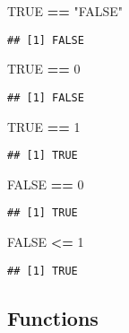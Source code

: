 \documentclass[
]{book}
\newenvironment{Shaded}{\begin{snugshade}}{\end{snugshade}}
\newcommand{\DecValTok}[1]{\textcolor[rgb]{0.00,0.00,0.81}{#1}}
\newcommand{\OperatorTok}[1]{\textcolor[rgb]{0.81,0.36,0.00}{\textbf{#1}}}
\newcommand{\OtherTok}[1]{\textcolor[rgb]{0.56,0.35,0.01}{#1}}
\newcommand{\StringTok}[1]{\textcolor[rgb]{0.31,0.60,0.02}{#1}}
\begin{document}
\begin{Shaded}
\begin{Highlighting}[]
\OtherTok{TRUE} \OperatorTok{==}\StringTok{ "FALSE"}
\end{Highlighting}
\end{Shaded}

\begin{verbatim}
## [1] FALSE
\end{verbatim}

\begin{Shaded}
\begin{Highlighting}[]
\OtherTok{TRUE} \OperatorTok{==}\StringTok{ }\DecValTok{0}
\end{Highlighting}
\end{Shaded}

\begin{verbatim}
## [1] FALSE
\end{verbatim}

\begin{Shaded}
\begin{Highlighting}[]
\OtherTok{TRUE} \OperatorTok{==}\StringTok{ }\DecValTok{1}
\end{Highlighting}
\end{Shaded}

\begin{verbatim}
## [1] TRUE
\end{verbatim}

\begin{Shaded}
\begin{Highlighting}[]
\OtherTok{FALSE} \OperatorTok{==}\StringTok{ }\DecValTok{0}
\end{Highlighting}
\end{Shaded}

\begin{verbatim}
## [1] TRUE
\end{verbatim}

\begin{Shaded}
\begin{Highlighting}[]
\OtherTok{FALSE} \OperatorTok{\textless{}=}\StringTok{ }\DecValTok{1}
\end{Highlighting}
\end{Shaded}

\begin{verbatim}
## [1] TRUE
\end{verbatim}

\hypertarget{functions}{%
\subsection{Functions}\label{functions}}
\end{document}

